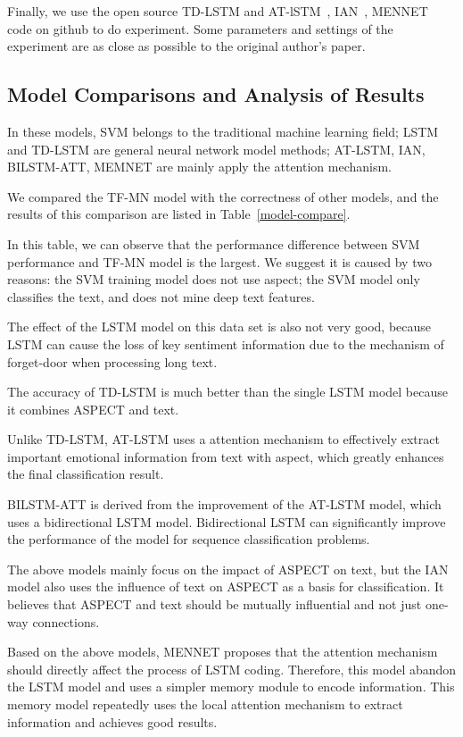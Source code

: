 \documentclass[runningheads, twocolumn]{llncs}
\begin{document}
Finally, we use the open source TD-LSTM and AT-lSTM~\cite{td-lstm_at-lstm}, IAN~\cite{IAN}, MENNET~\cite{MENNET} code on github to do experiment. Some parameters and settings of the experiment are as close as possible to the original author's paper.

\subsection{Model Comparisons and Analysis of Results}
In these models, SVM belongs to the traditional machine learning field; LSTM and TD-LSTM are general neural network model methods; AT-LSTM, IAN, BILSTM-ATT, MEMNET are mainly apply the attention mechanism.

 We compared the TF-MN model with the correctness of other models, and the results of this comparison are listed in Table~\ref{model-compare}. 
 
 In this table, we can observe that the performance difference between SVM performance and TF-MN model is the largest. We suggest it is caused by two reasons: the SVM training model does not use aspect; the SVM model only classifies the text, and does not mine deep text features. 
 
The effect of the LSTM model on this data set is also not very good, because LSTM can cause the loss of key sentiment information due to the mechanism of forget-door when processing long text.

The accuracy of TD-LSTM is much better than the single LSTM model because it combines ASPECT and text.

Unlike TD-LSTM, AT-LSTM uses a attention mechanism to effectively extract important emotional information from text with aspect, which greatly enhances the final classification result.

BILSTM-ATT is derived from the improvement of the AT-LSTM model, which uses a bidirectional LSTM model. Bidirectional LSTM can significantly improve the performance of the model for sequence classification problems.

The above models mainly focus on the impact of ASPECT on text, but the IAN model also uses the influence of text on ASPECT as a basis for classification. It believes that ASPECT and text should be mutually influential and not just one-way connections.

Based on the above models, MENNET proposes that the attention mechanism should directly affect the process of LSTM coding. Therefore, this model abandon the LSTM model and uses a simpler memory module to encode information. This memory model repeatedly uses the local attention mechanism to extract information and achieves good results.
\end{document}
